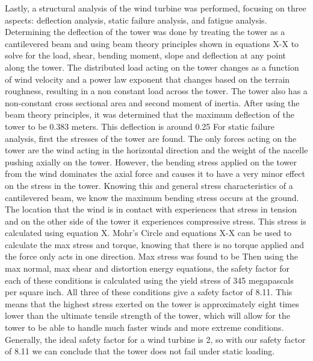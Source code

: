 \documentclass[11pt]{article}
\begin{document}
Lastly, a structural analysis of the wind turbine was performed, focusing on three aspects: deflection analysis, static failure analysis, and fatigue analysis. Determining the deflection of the tower was done by treating the tower as a cantilevered beam and using beam theory principles shown in equations X-X to solve for the load, shear, bending moment, slope and deflection at any point along the tower. The distributed load acting on the tower changes as a function of wind velocity and a power law exponent that changes based on the terrain roughness, resulting in a non constant load across the tower. The tower also has a non-constant cross sectional area and second moment of inertia. After using the beam theory principles, it was determined that the maximum deflection of the tower to be 0.383 meters. This deflection is around 0.25%
For static failure analysis, first the stresses of the tower are found. The only forces acting on the tower are the wind acting in the horizontal direction and the weight of the nacelle pushing axially on the tower. However, the bending stress applied on the tower from the wind dominates the axial force and causes it to have a very minor effect on the stress in the tower. Knowing this and general stress characteristics of a cantilevered beam, we know the maximum bending stress occurs at the ground. The location that the wind is in contact with experiences that stress in tension and on the other side of the tower it experiences compressive stress. This stress is calculated using equation X. Mohr’s Circle and equations X-X can be used to calculate the max stress and torque, knowing that there is no torque applied and the force only acts in one direction. Max stress was found to be Then using the max normal, max shear and distortion energy equations, the safety factor for each of these conditions is calculated using the yield stress of 345 megapascals per square inch. All three of these conditions give a safety factor of 8.11. This means that the highest stress exerted on the tower is approximately eight times lower than the ultimate tensile strength of the tower, which will allow for the tower to be able to handle much faster winds and more extreme conditions. Generally, the ideal safety factor for a wind turbine is 2, so with our safety factor of 8.11 we can conclude that the tower does not fail under static loading. 
\end{document}
